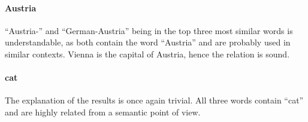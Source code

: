 \paragraph{Austria}
\enquote{Austria-} and \enquote{German-Austria} being in the top three most similar words is understandable, as both contain the word \enquote{Austria} and are probably used in similar contexts.
Vienna is the capital of Austria, hence the relation is sound.

\paragraph{cat}
The explanation of the results is once again trivial.
All three words contain \enquote{cat} and are highly related from a semantic point of view.
